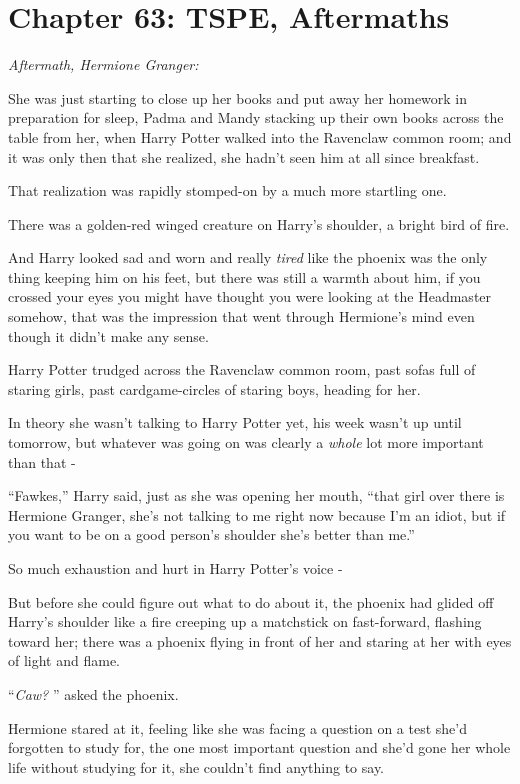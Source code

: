 \chapter{Chapter 63: TSPE, Aftermaths}
\emph{Aftermath, Hermione Granger:}

She was just starting to close up her books and put away her homework in
preparation for sleep, Padma and Mandy stacking up their own books
across the table from her, when Harry Potter walked into the Ravenclaw
common room; and it was only then that she realized, she hadn't seen him
at all since breakfast.

That realization was rapidly stomped-on by a much more startling one.

There was a golden-red winged creature on Harry's shoulder, a bright
bird of fire.

And Harry looked sad and worn and really \emph{tired} like the phoenix
was the only thing keeping him on his feet, but there was still a warmth
about him, if you crossed your eyes you might have thought you were
looking at the Headmaster somehow, that was the impression that went
through Hermione's mind even though it didn't make any sense.

Harry Potter trudged across the Ravenclaw common room, past sofas full
of staring girls, past cardgame-circles of staring boys, heading for
her.

In theory she wasn't talking to Harry Potter yet, his week wasn't up
until tomorrow, but whatever was going on was clearly a \emph{whole} lot
more important than that -

``Fawkes,'' Harry said, just as she was opening her mouth, ``that girl
over there is Hermione Granger, she's not talking to me right now
because I'm an idiot, but if you want to be on a good person's shoulder
she's better than me.''

So much exhaustion and hurt in Harry Potter's voice -

But before she could figure out what to do about it, the phoenix had
glided off Harry's shoulder like a fire creeping up a matchstick on
fast-forward, flashing toward her; there was a phoenix flying in front
of her and staring at her with eyes of light and flame.

``\emph{Caw?} '' asked the phoenix.

Hermione stared at it, feeling like she was facing a question on a test
she'd forgotten to study for, the one most important question and she'd
gone her whole life without studying for it, she couldn't find anything
to say.

